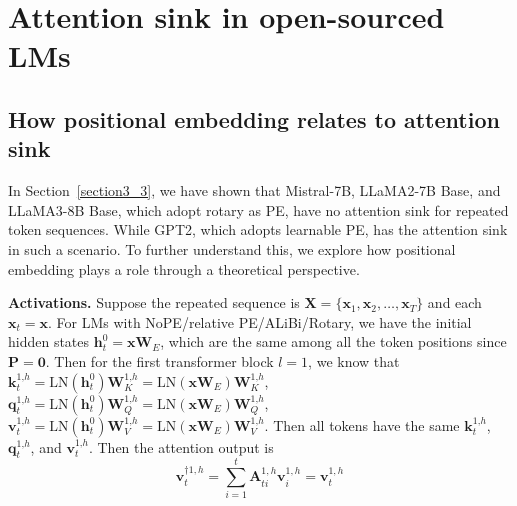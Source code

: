 \documentclass{article} \usepackage{iclr2025_conference,times}
\begin{document}
 \section{Attention sink in open-sourced LMs}

\subsection{How positional embedding relates to attention sink}\label{explain_pe}

In Section~\ref{section3_3}, we have shown that Mistral-7B, LLaMA2-7B Base, and LLaMA3-8B Base, which adopt rotary as PE, have no attention sink for repeated token sequences. While GPT2, which adopts learnable PE, has the attention sink in such a scenario. To further understand this, we explore how positional embedding plays a role through a theoretical perspective.

\textbf{Activations.} Suppose the repeated sequence is $\boldsymbol{X}=\{\boldsymbol{x}_1\textrm{,}\,\boldsymbol{x}_2\textrm{,}\,\ldots\textrm{,}\,\boldsymbol{x}_T\}$ and each $\boldsymbol{x}_t=\boldsymbol{x}$. For LMs with NoPE/relative PE/ALiBi/Rotary, we have the initial hidden states $\boldsymbol{h}_t^{0}=\boldsymbol{x}\boldsymbol{W}_E$, which are the same among all the token positions since $\boldsymbol{P}=\boldsymbol{0}$. Then for the first transformer block $l=1$, we know that $\boldsymbol{k}_t^{1\textrm{,}h}=\textrm{LN}(\boldsymbol{h}_t^{0})\boldsymbol{W}_{K}^{1\textrm{,}h}=\textrm{LN}(\boldsymbol{x}\boldsymbol{W}_E)\boldsymbol{W}_{K}^{1\textrm{,}h}$, $\boldsymbol{q}_t^{1\textrm{,}h}=\textrm{LN}(\boldsymbol{h}_t^{0})\boldsymbol{W}_{Q}^{1\textrm{,}h}=\textrm{LN}(\boldsymbol{x}\boldsymbol{W}_E)\boldsymbol{W}_{Q}^{1\textrm{,}h}$, $\boldsymbol{v}_t^{1\textrm{,}h}=\textrm{LN}(\boldsymbol{h}_t^{0})\boldsymbol{W}_{V}^{1\textrm{,}h}=\textrm{LN}(\boldsymbol{x}\boldsymbol{W}_E)\boldsymbol{W}_{V}^{1\textrm{,}h}$. Then all tokens have the same $\boldsymbol{k}_t^{1\textrm{,}h}$, $\boldsymbol{q}_t^{1\textrm{,}h}$, and $\boldsymbol{v}_t^{1\textrm{,}h}$. Then the attention output is
\begin{equation}
\boldsymbol{v}_t^{\dagger 1\textrm{,}\,h}=\sum_{i=1}^t\boldsymbol{A}_{ti}^{1\textrm{,}\,h}\boldsymbol{v}_i^{1\textrm{,}\,h}=\boldsymbol{v}_t^{1\textrm{,}\,h}
\end{equation}
\end{document}
